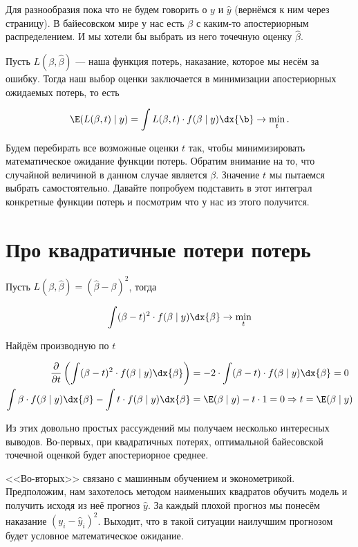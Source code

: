 Для разнообразия пока что не будем говорить о $y$ и $\hat y$ (вернёмся к ним через страницу). В байесовском мире у нас есть $\beta$ с каким-то апостериорным распределением. И мы хотели бы выбрать из него точечную оценку $\hat \beta$. 

Пусть $L(\beta, \hat \beta)$ --- наша функция потерь, наказание, которое мы несём за ошибку. Тогда наш выбор оценки заключается в минимизации апостериорных ожидаемых потерь, то есть 

\[ \E( L(\beta, t) \mid y) = \int L(\beta,t) \cdot f(\beta \mid y) \dx{\b} \to \min_{t}. \]

Будем перебирать все возможные оценки $t$ так, чтобы минимизировать математическое ожидание функции потерь. Обратим внимание на то, что случайной величиной в данном случае является $\beta$. Значение $t$ мы пытаемся выбрать самостоятельно.  Давайте попробуем подставить в этот интеграл конкретные функции потерь и посмотрим что у нас из этого получится. 

\section{Про квадратичные потери потерь}

Пусть $L(\beta, \hat \beta) = (\hat \beta - \beta)^2$, тогда 

\[ \int (\beta - t)^2 \cdot f(\beta \mid y) \dx{\beta} \to \min_{t} \] 

Найдём производную по $t$

\begin{align*}
\frac{\partial }{\partial t} \left(  \int (\beta - t)^2 \cdot f(\beta \mid y) \dx{\beta}   \right) &= - 2 \cdot \int (\beta - t) \cdot f(\beta \mid y) \dx{\beta} = 0 \\ 
\int \beta \cdot f(\beta \mid y) \dx{\beta} - \int  t \cdot f(\beta \mid y) \dx{\beta} &= \E(\beta \mid y) - t \cdot 1 =  0 \Rightarrow  t = \E(\beta \mid y) 
\end{align*}

Из этих довольно простых рассуждений мы получаем несколько интересных выводов. Во-первых, при квадратичных потерях, оптимальной байесовской точечной оценкой будет апостериорное среднее. 

<<Во-вторых>> связано с машинным обучением и эконометрикой. Предположим, нам захотелось методом наименьших квадратов обучить модель и получить исходя из неё прогноз $\hat y$. За каждый плохой прогноз мы понесём наказание $(y_i - \hat y_i)^2$. Выходит, что в такой ситуации наилучшим прогнозом будет условное математическое ожидание. 


